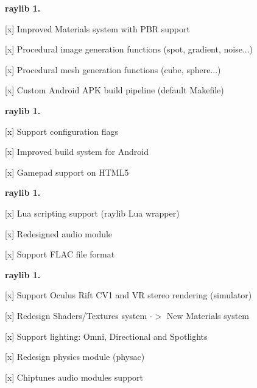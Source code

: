 {\bfseries{raylib 1.}}
\begin{DoxyItemize}
\item \mbox{[}x\mbox{]} Improved Materials system with PBR support
\item \mbox{[}x\mbox{]} Procedural image generation functions (spot, gradient, noise...)
\item \mbox{[}x\mbox{]} Procedural mesh generation functions (cube, sphere...)
\item \mbox{[}x\mbox{]} Custom Android APK build pipeline (default Makefile)
\end{DoxyItemize}

{\bfseries{raylib 1.}}
\begin{DoxyItemize}
\item \mbox{[}x\mbox{]} Support configuration flags
\item \mbox{[}x\mbox{]} Improved build system for Android
\item \mbox{[}x\mbox{]} Gamepad support on HTML5
\end{DoxyItemize}

{\bfseries{raylib 1.}}
\begin{DoxyItemize}
\item \mbox{[}x\mbox{]} Lua scripting support (raylib Lua wrapper)
\item \mbox{[}x\mbox{]} Redesigned audio module
\item \mbox{[}x\mbox{]} Support FLAC file format
\end{DoxyItemize}

{\bfseries{raylib 1.}}
\begin{DoxyItemize}
\item \mbox{[}x\mbox{]} Support Oculus Rift CV1 and VR stereo rendering (simulator)
\item \mbox{[}x\mbox{]} Redesign Shaders/\+Textures system -\/\texorpdfstring{$>$}{>} New Materials system
\item \mbox{[}x\mbox{]} Support lighting\+: Omni, Directional and Spotlights
\item \mbox{[}x\mbox{]} Redesign physics module (physac)
\item \mbox{[}x\mbox{]} Chiptunes audio modules support
\end{DoxyItemize}

